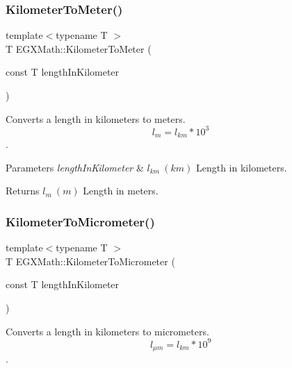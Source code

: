 \subsubsection{\texorpdfstring{Kilometer\+To\+Meter()}{KilometerToMeter()}}
{\footnotesize\ttfamily template$<$typename T $>$ \\
T E\+G\+X\+Math\+::\+Kilometer\+To\+Meter (\begin{DoxyParamCaption}\item[{const T}]{length\+In\+Kilometer }\end{DoxyParamCaption})}



Converts a length in kilometers to meters. \[ l_{m}=l_{km} * 10^{3} \]. 


\begin{DoxyParams}{Parameters}
{\em length\+In\+Kilometer} & $ l_{km}\ (km)$ Length in kilometers. \\
\hline
\end{DoxyParams}
\begin{DoxyReturn}{Returns}
$ l_{m}\ (m)$ Length in meters. 
\end{DoxyReturn}
\mbox{\label{group___e_g_x_math-_conversions-_length_conversions-_kilometer-_s_i_ga345d16c72fcb96ff1dc3b7f290b94c94}} 
\subsubsection{\texorpdfstring{Kilometer\+To\+Micrometer()}{KilometerToMicrometer()}}
{\footnotesize\ttfamily template$<$typename T $>$ \\
T E\+G\+X\+Math\+::\+Kilometer\+To\+Micrometer (\begin{DoxyParamCaption}\item[{const T}]{length\+In\+Kilometer }\end{DoxyParamCaption})}



Converts a length in kilometers to micrometers. \[ l_{\mu m}=l_{km} * 10^{9} \]. 

